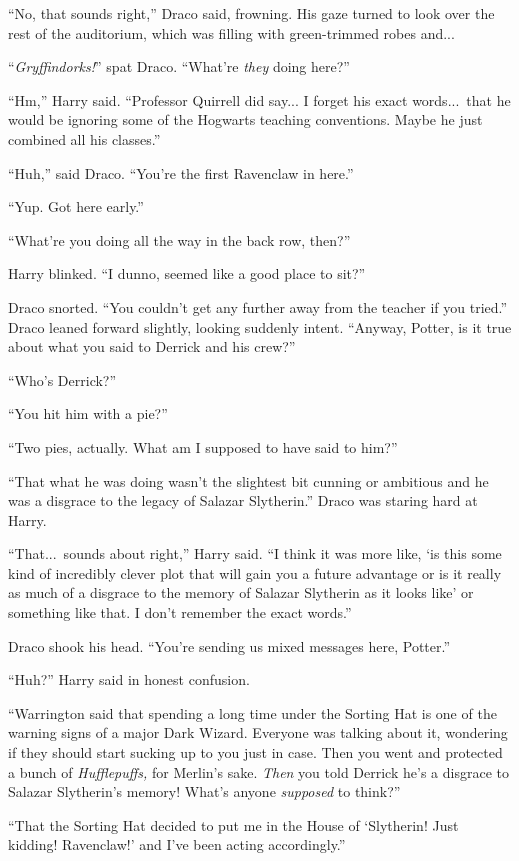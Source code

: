 “No, that sounds right,” Draco said, frowning. His gaze turned to look over the rest of the auditorium, which was filling with green-trimmed robes and...

“\emph{Gryffindorks!}” spat Draco. “What’re \emph{they} doing here?”

“Hm,” Harry said. “Professor Quirrell did say... I forget his exact words...\ that he would be ignoring some of the Hogwarts teaching conventions. Maybe he just combined all his classes.”

“Huh,” said Draco. “You’re the first Ravenclaw in here.”

“Yup. Got here early.”

“What’re you doing all the way in the back row, then?”

Harry blinked. “I dunno, seemed like a good place to sit?”

Draco snorted. “You couldn’t get any further away from the teacher if you tried.” Draco leaned forward slightly, looking suddenly intent. “Anyway, Potter, is it true about what you said to Derrick and his crew?”

“Who’s Derrick?”

“You hit him with a pie?”

“Two pies, actually. What am I supposed to have said to him?”

“That what he was doing wasn’t the slightest bit cunning or ambitious and he was a disgrace to the legacy of Salazar Slytherin.” Draco was staring hard at Harry.

“That...\ sounds about right,” Harry said. “I think it was more like, ‘is this some kind of incredibly clever plot that will gain you a future advantage or is it really as much of a disgrace to the memory of Salazar Slytherin as it looks like’ or something like that. I don’t remember the exact words.”

Draco shook his head. “You’re sending us mixed messages here, Potter.”

“Huh?” Harry said in honest confusion.

“Warrington said that spending a long time under the Sorting Hat is one of the warning signs of a major Dark Wizard. Everyone was talking about it, wondering if they should start sucking up to you just in case. Then you went and protected a bunch of \emph{Hufflepuffs,} for Merlin’s sake. \emph{Then} you told Derrick he’s a disgrace to Salazar Slytherin’s memory! What’s anyone \emph{supposed} to think?”

“That the Sorting Hat decided to put me in the House of ‘Slytherin! Just kidding! Ravenclaw!’ and I’ve been acting accordingly.”

